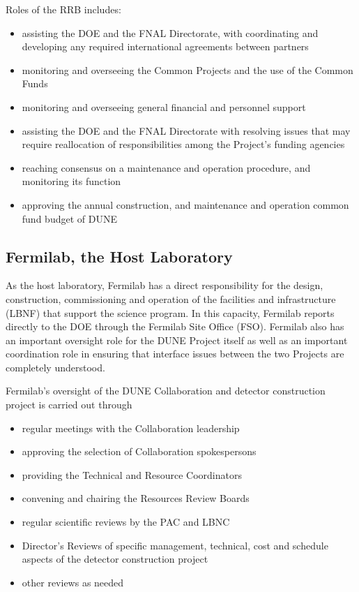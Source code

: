 Roles of the RRB includes:

\begin{itemize}
\item assisting the DOE and the FNAL Directorate,
with coordinating and developing any required international
agreements between partners
\item monitoring and overseeing the Common Projects and the
use of the Common Funds
\item monitoring and overseeing general financial and personnel support
\item assisting the DOE and the FNAL Directorate
with resolving issues that may require reallocation of responsibilities
among the Project's funding agencies
\item reaching consensus on a maintenance and operation procedure,
and monitoring its function
\item  approving the annual construction, and maintenance and operation common fund 
budget of DUNE
\end{itemize}

\subsection{Fermilab, the Host Laboratory}

As the host laboratory, Fermilab has a direct responsibility for the design,
construction, commissioning and operation of the facilities and
infrastructure (LBNF) that support the science program. 
In this capacity, Fermilab reports
directly to the DOE through the Fermilab Site Office (FSO).
Fermilab also has an important oversight role for the DUNE Project
itself as well as an important coordination role in ensuring that
interface issues between the two Projects are completely understood.

Fermilab's oversight of the DUNE Collaboration and detector
construction project is carried out through
\begin{itemize}
\item regular meetings with the Collaboration leadership
\item approving the selection of Collaboration spokespersons
\item  providing the Technical and Resource Coordinators
\item  convening and chairing the Resources Review Boards
\item  regular scientific reviews by the PAC and LBNC
\item  Director's Reviews of specific management, technical,
cost and schedule aspects of the detector construction project
\item other reviews as needed
\end{itemize}

